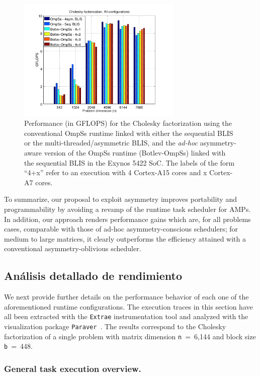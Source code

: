 \begin{figure}
\centering
\includegraphics[width=0.70\textwidth]{Plots/Comparative/comparative}
\caption{Performance (in GFLOPS) for the Cholesky factorization using
         the conventional OmpSs runtime linked with 
         either the sequential BLIS or the multi-threaded/asymmetric BLIS, and the {\em ad-hoc} asymmetry-aware version of the
         OmpSs runtime (Botlev-OmpSs) linked with the sequential BLIS in 
         the Exynos 5422 SoC. The labels of the form ``4+x'' refer to an execution with 4 Cortex-A15 cores and x Cortex-A7 cores.}
\label{fig:comparative}
\end{figure}

To summarize, our proposal to exploit asymmetry improves portability and programmability by avoiding
a revamp of the runtime task scheduler for AMPs. In addition, our approach renders performance
gains which are, for all problems cases, comparable with those of ad-hoc asymmetry-conscious schedulers; 
for medium to large matrices, it clearly outperforms the efficiency attained with a conventional 
asymmetry-oblivious scheduler.

\subsection{Análisis detallado de rendimiento}

We next provide further details on the performance behavior of each one of the aforementioned runtime configurations.
The execution traces in this section have all been extracted with the {\tt Extrae} instrumentation
tool and analyzed with the visualization package {\tt Paraver}~\cite{Paraver}. 
The results correspond to the Cholesky factorization of a single problem with matrix dimension {\tt n}~=~6,144 and 
block size {\tt b}~=~448.

\subsubsection{General task execution overview.}

